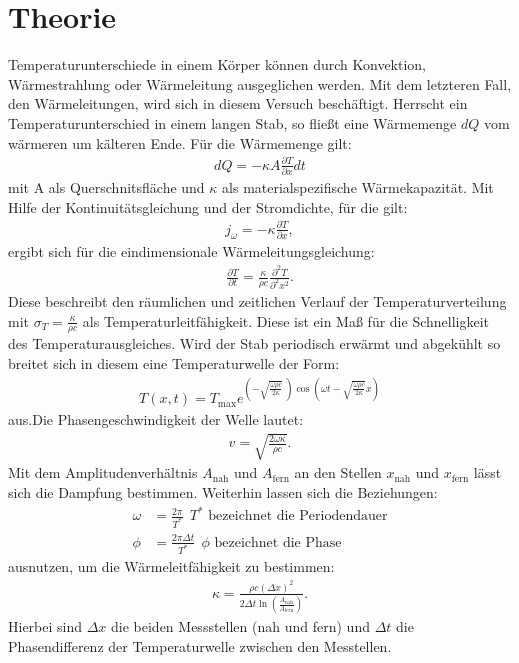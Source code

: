 \section{Theorie}
\label{sec:Theorie}
Temperaturunterschiede in einem Körper können durch Konvektion, Wärmestrahlung oder Wärmeleitung ausgeglichen werden.
Mit dem letzteren Fall, den Wärmeleitungen, wird sich in diesem Versuch beschäftigt.
Herrscht ein Temperaturunterschied in einem langen Stab, so fließt eine Wärmemenge $dQ$ vom wärmeren um kälteren Ende.
Für die Wärmemenge gilt:
\begin{align}
  dQ=-\kappa A\frac{\partial T}{\partial x}dt \label{eqn:dq}
\end{align}
mit A als Querschnitsfläche und $\kappa$ als materialspezifische Wärmekapazität.
Mit Hilfe der Kontinuitätsgleichung und der Stromdichte, für die gilt:
\begin{align}
  j_\omega=-\kappa\frac{\partial T}{\partial x},
\end{align}
ergibt sich für die eindimensionale Wärmeleitungsgleichung:
\begin{align}
  \frac{\partial T}{\partial t}=\frac{\kappa}{\rho c} \frac{\partial^2 T}{\partial^2 x^2}\label{eqn:wärmeleitungsgleichung}.
\end{align}
Diese beschreibt den räumlichen und zeitlichen Verlauf der Temperaturverteilung mit $\sigma_T=\frac{\kappa}{\rho c}$ als
Temperaturleitfähigkeit. Diese ist ein Maß für die Schnelligkeit des Temperaturausgleiches.
Wird der Stab periodisch erwärmt und abgekühlt so breitet sich in diesem eine Temperaturwelle der Form:
\begin{align}
  T(x,t)=T_\mathrm{max} e^{\left(-\sqrt{\frac{\omega\rho c}{2\kappa}} \ \right)\cos\left(\omega t-\sqrt{\frac{\omega\rho c}{2\kappa}} x\right)}
\end{align}
aus.Die Phasengeschwindigkeit der Welle lautet:
\begin{align}
  v=\sqrt{\frac{2\omega\kappa}{\rho c}}.
\end{align}
Mit dem Amplitudenverhältnis $A_\mathrm{nah}$ und $A_\mathrm{fern}$ an den Stellen $x_\mathrm{nah}$ und $x_\mathrm{fern}$
lässt sich die Dampfung bestimmen. Weiterhin lassen sich die Beziehungen:
\begin{align}
  \omega&=\frac{2\pi}{T^{*}} \ \ \text{$T^{*}$ bezeichnet die Periodendauer} \\
  \phi&=\frac{2\pi\Delta t}{T^{*}} \ \ \text{$\phi$ bezeichnet die Phase}
\end{align}
ausnutzen, um die Wärmeleitfähigkeit zu bestimmen:
\begin{align}
  \kappa=\frac{\rho c(\Delta x)^2}{2\Delta t \ln{\left(\frac{A_\mathrm{nah}}{A_\mathrm{fern}}\right)}} \label{eqn:k}.
\end{align}
Hierbei sind $\Delta x$ die beiden Messstellen (nah und fern) und $\Delta t$ die Phasendifferenz der Temperaturwelle zwischen den Messtellen.
